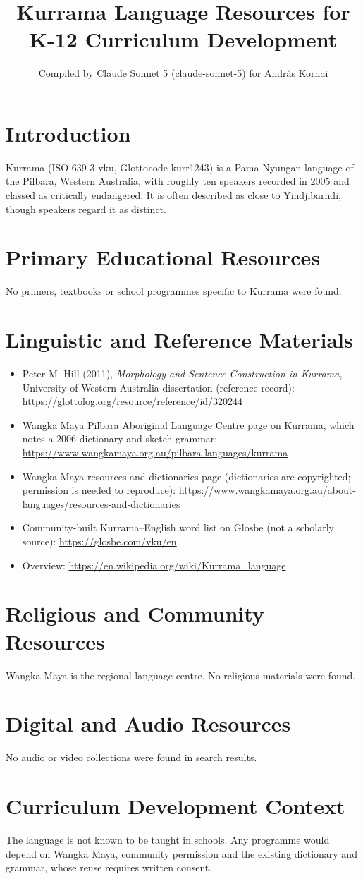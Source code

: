 \documentclass[12pt]{article}
\title{Kurrama Language Resources for K-12 Curriculum Development}
\author{Compiled by Claude Sonnet 5 (claude-sonnet-5) for Andr\'as Kornai}
\date{}
\begin{document}
\maketitle

\section{Introduction}
Kurrama (ISO 639-3 vku, Glottocode kurr1243) is a Pama-Nyungan language of the Pilbara, Western Australia, with roughly ten speakers recorded in 2005 and classed as critically endangered. It is often described as close to Yindjibarndi, though speakers regard it as distinct.

\section{Primary Educational Resources}
No primers, textbooks or school programmes specific to Kurrama were found.

\section{Linguistic and Reference Materials}
\begin{itemize}
\item Peter M. Hill (2011), \emph{Morphology and Sentence Construction in Kurrama}, University of Western Australia dissertation (reference record): \url{https://glottolog.org/resource/reference/id/320244}
\item Wangka Maya Pilbara Aboriginal Language Centre page on Kurrama, which notes a 2006 dictionary and sketch grammar: \url{https://www.wangkamaya.org.au/pilbara-languages/kurrama}
\item Wangka Maya resources and dictionaries page (dictionaries are copyrighted; permission is needed to reproduce): \url{https://www.wangkamaya.org.au/about-languages/resources-and-dictionaries}
\item Community-built Kurrama--English word list on Glosbe (not a scholarly source): \url{https://glosbe.com/vku/en}
\item Overview: \url{https://en.wikipedia.org/wiki/Kurrama_language}
\end{itemize}

\section{Religious and Community Resources}
Wangka Maya is the regional language centre. No religious materials were found.

\section{Digital and Audio Resources}
No audio or video collections were found in search results.

\section{Curriculum Development Context}
The language is not known to be taught in schools. Any programme would depend on Wangka Maya, community permission and the existing dictionary and grammar, whose reuse requires written consent.
\end{document}

